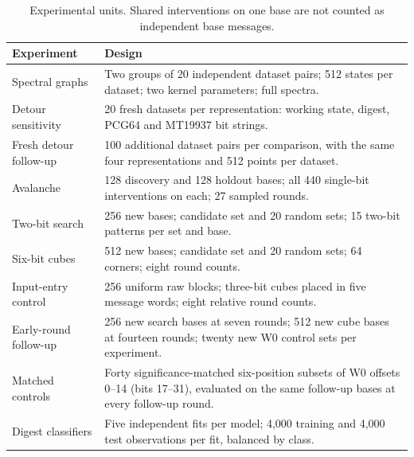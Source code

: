 \documentclass[11pt]{article}
\begin{document}
\begin{table}[!htbp]
\centering\small
\caption{Experimental units. Shared interventions on one base are not counted as independent base messages.}
\begin{tabular}{@{}p{.25\linewidth}p{.66\linewidth}@{}}\toprule
Experiment & Design \\\midrule
Spectral graphs & Two groups of 20 independent dataset pairs; 512 states per dataset; two kernel parameters; full spectra. \\
Detour sensitivity & 20 fresh datasets per representation: working state, digest, PCG64 and MT19937 bit strings. \\
Fresh detour follow-up & 100 additional dataset pairs per comparison, with the same four representations and 512 points per dataset. \\
Avalanche & 128 discovery and 128 holdout bases; all 440 single-bit interventions on each; 27 sampled rounds. \\
Two-bit search & 256 new bases; candidate set and 20 random sets; 15 two-bit patterns per set and base. \\
Six-bit cubes & 512 new bases; candidate set and 20 random sets; 64 corners; eight round counts. \\
Input-entry control & 256 uniform raw blocks; three-bit cubes placed in five message words; eight relative round counts. \\
Early-round follow-up & 256 new search bases at seven rounds; 512 new cube bases at fourteen rounds; twenty new W0 control sets per experiment. \\
Matched controls & Forty significance-matched six-position subsets of W0 offsets 0--14 (bits 17--31), evaluated on the same follow-up bases at every follow-up round. \\
Digest classifiers & Five independent fits per model; 4,000 training and 4,000 test observations per fit, balanced by class. \\\bottomrule
\end{tabular}
\end{table}
\end{document}
